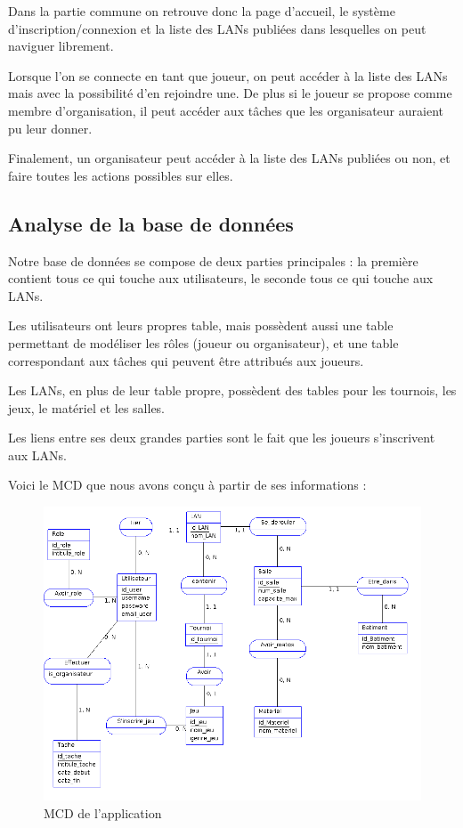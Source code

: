 \documentclass[12pt]{article}
\begin{document}
Dans la partie commune on retrouve donc la page d'accueil, le système d'inscription/connexion et la liste des LANs publiées dans lesquelles on peut naviguer librement.
\newline

Lorsque l'on se connecte en tant que joueur, on peut accéder à la liste des LANs mais avec la possibilité d'en rejoindre une. De plus si le joueur se propose comme membre d'organisation, il peut accéder aux tâches que les organisateur auraient pu leur donner.
\newline

Finalement, un organisateur peut accéder à la liste des LANs publiées ou non, et faire toutes les actions possibles sur elles.
\newpage
\subsection{Analyse de la base de données}

Notre base de données se compose de deux parties principales : la première contient tous ce qui touche aux utilisateurs, le seconde tous ce qui touche aux LANs.
\newline

Les utilisateurs ont leurs propres table, mais possèdent aussi une table permettant de modéliser les rôles (joueur ou organisateur), et une table correspondant aux tâches qui peuvent être attribués aux joueurs.
\newline

Les LANs, en plus de leur table propre, possèdent des tables pour les tournois, les jeux, le matériel et les salles.
\newline

Les liens entre ses deux grandes parties sont le fait que les joueurs s'inscrivent aux LANs.
\newline

Voici le MCD que nous avons conçu à partir de ses informations :

\begin{figure}[htp]
\centering
\includegraphics[scale=0.50]{images/mcd.png}
\caption{MCD de l'application}
\label{}
\end{figure}
\end{document}

